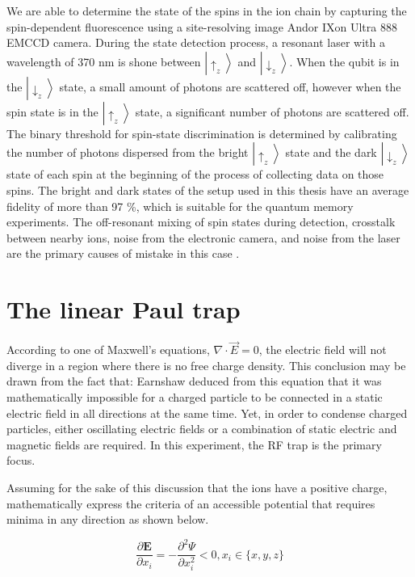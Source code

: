 We are able to determine the state of the spins in the ion chain by capturing the spin-dependent fluorescence using a site-resolving image Andor IXon Ultra 888 EMCCD camera. During the state detection process, a resonant laser with a wavelength of 370 nm is shone between $\left|\uparrow_z\right\rangle$ and $\left|\downarrow_z\right\rangle$. When the qubit is in the $\left|\downarrow_z\right\rangle$ state, a small amount of photons are scattered off, however when the spin state is in the $\left|\uparrow_z\right\rangle$ state, a significant number of photons are scattered off. The binary threshold for spin-state discrimination is determined by calibrating the number of photons dispersed from the bright $\left|\uparrow_z\right\rangle$ state and the dark $\left|\downarrow_z\right\rangle$ state of each spin at the beginning of the process of collecting data on those spins. The bright and dark states of the setup used in this thesis have an average fidelity of more than 97 \%, which is suitable for the quantum memory experiments. The off-resonant mixing of spin states during detection, crosstalk between nearby ions, noise from the electronic camera, and noise from the laser are the primary causes of mistake in this case \cite{RN128}.


\section{The linear Paul trap}

According to one of Maxwell's equations, $\nabla \cdot \vec{E}=0$, the electric field will not diverge in a region where there is no free charge density. This conclusion may be drawn from the fact that: Earnshaw deduced from this equation that it was mathematically impossible for a charged particle to be connected in a static electric field in all directions at the same time. Yet, in order to condense charged particles, either oscillating electric fields or a combination of static electric and magnetic fields are required. In this experiment, the RF trap is the primary focus.

Assuming for the sake of this discussion that the ions have a positive charge, mathematically express the criteria of an accessible potential that requires minima in any direction as shown below.

\begin{equation}\label{eq:minima}
    \frac{\partial \mathbf{E}}{\partial x_i}=-\frac{\partial^2 \Psi}{\partial x_i^2}<0, x_i \in\{x, y, z\}
\end{equation}

